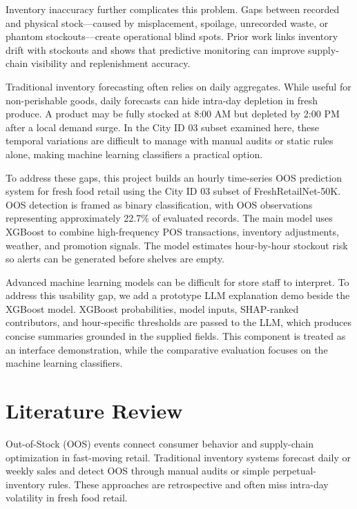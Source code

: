 \documentclass[11pt, a4paper]{article}
\begin{document}
Inventory inaccuracy further complicates this problem. Gaps between recorded and physical stock---caused by misplacement, spoilage, unrecorded waste, or phantom stockouts---create operational blind spots. Prior work links inventory drift with stockouts and shows that predictive monitoring can improve supply-chain visibility and replenishment accuracy.

Traditional inventory forecasting often relies on daily aggregates. While useful for non-perishable goods, daily forecasts can hide intra-day depletion in fresh produce. A product may be fully stocked at 8:00 AM but depleted by 2:00 PM after a local demand surge. In the City ID 03 subset examined here, these temporal variations are difficult to manage with manual audits or static rules alone, making machine learning classifiers a practical option.

To address these gaps, this project builds an hourly time-series OOS prediction system for fresh food retail using the City ID 03 subset of FreshRetailNet-50K. OOS detection is framed as binary classification, with OOS observations representing approximately 22.7\% of evaluated records. The main model uses XGBoost to combine high-frequency POS transactions, inventory adjustments, weather, and promotion signals. The model estimates hour-by-hour stockout risk so alerts can be generated before shelves are empty.

Advanced machine learning models can be difficult for store staff to interpret. To address this usability gap, we add a prototype LLM explanation demo beside the XGBoost model. XGBoost probabilities, model inputs, SHAP-ranked contributors, and hour-specific thresholds are passed to the LLM, which produces concise summaries grounded in the supplied fields. This component is treated as an interface demonstration, while the comparative evaluation focuses on the machine learning classifiers.

\section{Literature Review}

Out-of-Stock (OOS) events connect consumer behavior and supply-chain optimization in fast-moving retail. Traditional inventory systems forecast daily or weekly sales and detect OOS through manual audits or simple perpetual-inventory rules. These approaches are retrospective and often miss intra-day volatility in fresh food retail.
\end{document}
